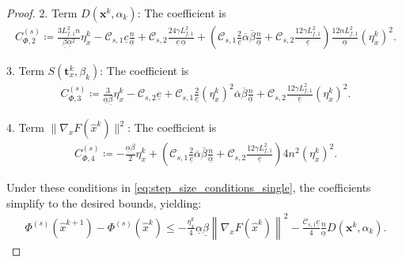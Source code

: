 \documentclass[10pt,a4paper]{amsart}
\begin{document}
\begin{proof}
    2. Term $D(\mathbf{x}^{k}, \alpha_{k})$: The coefficient is
    \begin{align*}
          C_{\Phi,2}^{(s)} \coloneqq \frac{3 L_{f,1}^{2} n}{\underline{\beta} \underline{\alpha}^{2}} \eta_x^{k} - \mathcal{C}_{s,1} \underline{c}\frac{n}{\underline{\alpha}} + \mathcal{C}_{s,2} \frac{24\gamma L_{f,1}^{2}}{\underline{e}\, \underline{\alpha}} + \left( \mathcal{C}_{s,1} \frac{2}{\underline{c}} \overline{\alpha}\overline{\beta}\frac{n}{\underline{\alpha}} + \mathcal{C}_{s,2} \frac{12\gamma L_{f,1}^{2}}{\underline{e}} \right) \frac{12 n L_{f,1}^{2}}{\underline{\alpha}} (\eta_{x}^{k})^{2}.
    \end{align*}
    
    3. Term $S(\mathbf{t}_{x}^{k},\beta_{k})$: The coefficient is
    \begin{align*}
          C_{\Phi,3}^{(s)} \coloneqq \frac{3}{\underline{\alpha}\underline{\beta}} \eta_x^{k} - \mathcal{C}_{s,2} \underline{e} + \mathcal{C}_{s,1} \frac{2}{\underline{c}}(\eta_{x}^{k})^{2} \overline{\alpha}\overline{\beta} \frac{n}{\underline{\alpha}} + \mathcal{C}_{s,2} \frac{12\gamma L_{f,1}^{2}}{\underline{e}} (\eta_{x}^{k})^{2}.
    \end{align*}

    
    4. Term $\|\nabla_{x} F({\hat{x}}^k)\|^{2}$: The coefficient is
    \begin{align*}
       C_{\Phi,4}^{(s)} \coloneqq - \frac{\underline{\alpha}\underline{\beta}}{2} \eta_x^{k} + \left( \mathcal{C}_{s,1} \frac{2}{\underline{c}} \overline{\alpha}\overline{\beta} \frac{n}{\underline{\alpha}}+ \mathcal{C}_{s,2} \frac{12\gamma L_{f,1}^{2}}{\underline{e}} \right) 4n^{2} (\eta_{x}^{k})^{2}.
    \end{align*}
   
    Under these conditions in \eqref{eq:step_size_conditions_single}, the coefficients simplify to the desired bounds, yielding:
    \begin{align}\label{eq:lyapunov_descent_single}
        \Phi^{(s)}({\hat{x}}^{k+1}) - \Phi^{(s)}({\hat{x}}^{k}) \leq - \frac{\eta_x^{k}}{4}\underline{\alpha}\underline{\beta} \left\| \nabla_{x}F(\hat{x}^{k}) \right\|^{2} - \frac{\mathcal{C}_{s,1} \underline{c}}{4} \frac{n}{\underline{\alpha}} D(\mathbf{x}^{k}, \alpha_{k}).
    \end{align}
\end{proof}
\end{document}
